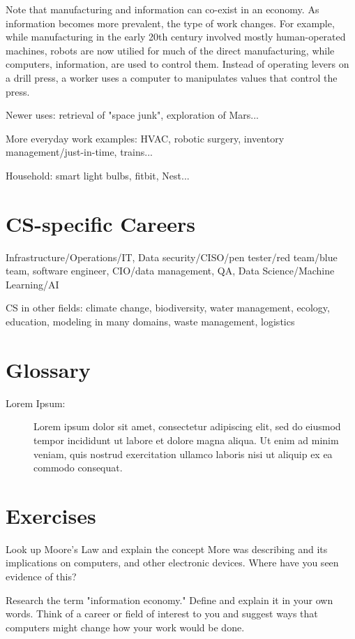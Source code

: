 Note that manufacturing and information can co-exist in an economy. As information becomes more prevalent, the type of work changes. For example, while manufacturing in the early 20th century involved mostly human-operated machines, robots are now utilied for much of the direct manufacturing, while computers, information, are used to control them. Instead of operating levers on a drill press, a worker uses a computer to manipulates values that control the press.

Newer uses: retrieval of "space junk", exploration of Mars...

More everyday work examples: HVAC, robotic surgery, inventory management/just-in-time, trains...

Household: smart light bulbs, fitbit, Nest...

	
\section{CS-specific Careers}

Infrastructure/Operations/IT, Data security/CISO/pen tester/red team/blue team, software engineer, CIO/data management, QA, Data Science/Machine Learning/AI

CS in other fields: climate change, biodiversity, water management, ecology, education, modeling in many domains, waste management, logistics



\section{Glossary}

\begin{description}
	
	\item[Lorem Ipsum:]  Lorem ipsum dolor sit amet, consectetur adipiscing elit, sed do eiusmod tempor incididunt ut labore et dolore magna aliqua. Ut enim ad minim veniam, quis nostrud exercitation ullamco laboris nisi ut aliquip ex ea commodo consequat.
	
\end{description}

\section{Exercises}

\begin{ex}
	Look up Moore's Law and explain the concept More was describing and its implications on computers, and other electronic devices. Where have you seen evidence of this?	
\end{ex}
\begin{ex}
	Research the term "information economy." Define and explain it in your own words. Think of a career or field of interest to you and suggest ways that computers might change how your work would be done.
\end{ex}

